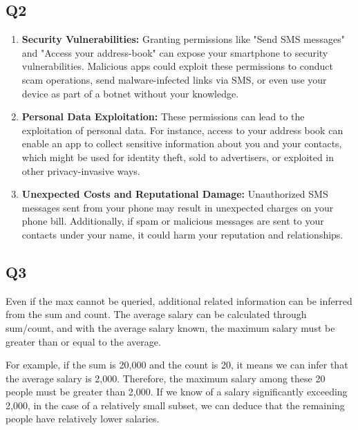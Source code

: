 \documentclass{article}
\begin{document}
\subsection{Q2}
	\begin{enumerate}
		\item \textbf{Security Vulnerabilities:} Granting permissions like "Send SMS messages" and "Access your address-book" can expose your smartphone to security vulnerabilities. Malicious apps could exploit these permissions to conduct scam operations, send malware-infected links via SMS, or even use your device as part of a botnet without your knowledge.

		\item \textbf{Personal Data Exploitation:} These permissions can lead to the exploitation of personal data. For instance, access to your address book can enable an app to collect sensitive information about you and your contacts, which might be used for identity theft, sold to advertisers, or exploited in other privacy-invasive ways.

		\item \textbf{Unexpected Costs and Reputational Damage:} Unauthorized SMS messages sent from your phone may result in unexpected charges on your phone bill. Additionally, if spam or malicious messages are sent to your contacts under your name, it could harm your reputation and relationships.
	\end{enumerate}

\subsection{Q3}
	Even if the max cannot be queried, additional related information can be inferred from the sum and count. The average salary can be calculated through sum/count, and with the average salary known, the maximum salary must be greater than or equal to the average.

	For example, if the sum is 20,000 and the count is 20, it means we can infer that the average salary is 2,000. Therefore, the maximum salary among these 20 people must be greater than 2,000. If we know of a salary significantly exceeding 2,000, in the case of a relatively small subset, we can deduce that the remaining people have relatively lower salaries.


 
\end{document}
